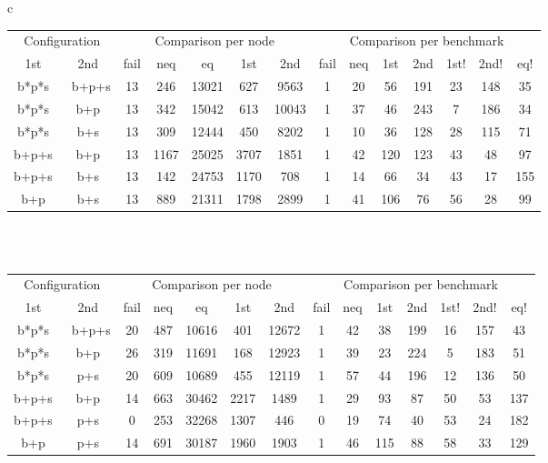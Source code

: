 \documentclass[envcountsame]{llncs}
\begin{document}
\begin{figure}[!htb]
\begin{center}
\begin{tabular}{c}
\begin{tabular}{|cc||ccccc|ccccccc|}
\hline
\multicolumn{2}{|c||}{Configuration} &
\multicolumn{5}{c|}{Comparison per node} &
\multicolumn{7}{c|}{Comparison per benchmark}
\\
1st & 2nd &
fail & neq & eq & 1st & 2nd &
fail & neq & 1st & 2nd & 1st! & 2nd! & eq!
\\ \hline
b*p*s & ~b+p+s &
13 & 246 & 13021 & 627 & 9563 & 
1 & 20 & 56 & 191 & 23 & 148 & 35
\\
b*p*s & b+p &
13 & 342 & 15042 & 613 & 10043 & 
1 & 37 & 46 & 243 & 7 & 186 & 34
\\
b*p*s & b+s &
13 & 309 & 12444 & 450 & 8202 & 
1 & 10 & 36 & 128 & 28 & 115 & 71
\\
b+p+s & b+p &
13 & 1167 & 25025 & 3707 & 1851 & 
1 & 42 & 120 & 123 & 43 & 48 & 97
\\
b+p+s & b+s &
13 & 142 & 24753 & 1170 & 708 & 
1 & 14 & 66 & 34 & 43 & 17 & 155
\\
b+p & b+s &
13 & 889 & 21311 & 1798 & 2899 & 
1 & 41 & 106 & 76 & 56 & 28 & 99
\\
\hline
\end{tabular}
 \\ \\
\begin{tabular}{|cc||ccccc|ccccccc|}
\hline
\multicolumn{2}{|c||}{Configuration} &
\multicolumn{5}{c|}{Comparison per node} &
\multicolumn{7}{c|}{Comparison per benchmark}
\\
1st & 2nd &
fail & neq & eq & 1st & 2nd &
fail & neq & 1st & 2nd & 1st! & 2nd! & eq!
\\ \hline
b*p*s & ~b+p+s &
20 & 487 & 10616 & 401 & 12672 & 
1 & 42 & 38 & 199 & 16 & 157 & 43
\\
b*p*s & b+p &
26 & 319 & 11691 & 168 & 12923 & 
1 & 39 & 23 & 224 & 5 & 183 & 51
\\
b*p*s & p+s &
20 & 609 & 10689 & 455 & 12119 & 
1 & 57 & 44 & 196 & 12 & 136 & 50
\\
b+p+s & b+p &
14 & 663 & 30462 & 2217 & 1489 & 
1 & 29 & 93 & 87 & 50 & 53 & 137
\\
b+p+s & p+s &
0 & 253 & 32268 & 1307 & 446 & 
0 & 19 & 74 & 40 & 53 & 24 & 182
\\
b+p & p+s & 
14 & 691 & 30187 & 1960 & 1903 & 
1 & 46 & 115 & 88 & 58 & 33 & 129
\\
\hline

\end{tabular}
\end{tabular}
\end{center}
\end{figure}
\end{document}
